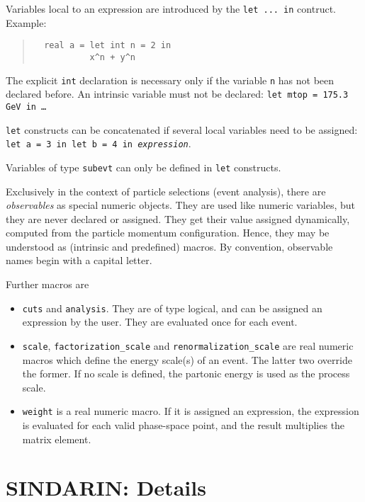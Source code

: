 \documentclass[12pt]{book}
\newcommand{\ttt}[1]{\texttt{#1}}
\begin{document}
Variables local to an expression are introduced by the \ttt{let ... in}
contruct.  Example:
\begin{quote}
\begin{footnotesize}
\begin{verbatim}
  real a = let int n = 2 in
           x^n + y^n 
\end{verbatim}
\end{footnotesize}
\end{quote}
The explicit \ttt{int} declaration is necessary only if the variable \ttt{n}
has not been declared before.  An intrinsic variable must not be declared:
\ttt{let mtop = 175.3 GeV in \ldots}

\ttt{let} constructs can be concatenated if several local variables need to
be assigned: \ttt{let a = 3 in let b = 4 in \textit{expression}}.

Variables of type \ttt{subevt} can only be defined in \ttt{let} constructs.

Exclusively in the context of particle selections (event analysis), there are
\emph{observables} as special numeric objects.  They are used like numeric
variables, but they are never declared or assigned.  They get their value
assigned dynamically, computed from the particle momentum configuration.
Hence, they may be understood as (intrinsic and predefined) macros.
By convention, observable names begin with a capital letter.

Further macros are
\begin{itemize}
\item
  \ttt{cuts} and \ttt{analysis}.  They are of type logical, and can be
  assigned an expression by the user.  They are evaluated once for
  each event.
\item
  \ttt{scale}, \ttt{factorization\_scale} and
  \ttt{renormalization\_scale} are real numeric macros which define the
  energy scale(s) of an event.  The latter two override the former.
  If no scale is defined, the partonic energy is used as the process scale.
\item 
  \ttt{weight} is a real numeric macro.  If it is assigned an
  expression, the expression is evaluated for each valid phase-space
  point, and the result multiplies the matrix element.
\end{itemize}



\chapter{SINDARIN: Details}
\end{document}
